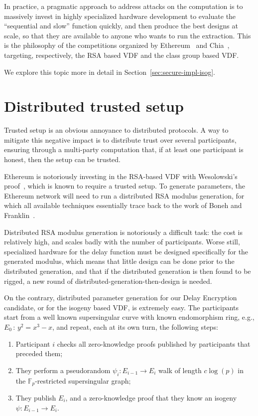 \documentclass{llncs}
\newcommand{\F}{\mathbb{F}}
\begin{document}
In practice, a pragmatic approach to address attacks on the
computation is to massively invest in highly specialized hardware
development to evaluate the ``sequential and slow'' function quickly,
and then produce the best designs at scale, so that they are available
to anyone who wants to run the extraction. %
This is the philosophy of the competitions organized by
Ethereum~\cite{ethereum-vdf} and Chia~\cite{chia-vdf}, targeting,
respectively, the RSA based VDF and the class group based VDF.

We explore this topic more in detail in
Section~\ref{sec:secure-impl-isog}.


\section{Distributed trusted setup}
\label{sec:distr-trust-setup}

Trusted setup is an obvious annoyance to distributed protocols. %
A way to mitigate this negative impact is to distribute trust over
several participants, ensuring through a multi-party computation that,
if at least one participant is honest, then the setup can be trusted.

Ethereum is notoriously investing in the RSA-based VDF with
Wesolowski's proof~\cite{ethereum-vdf,Wesolowski}, which is known to
require a trusted setup. %
To generate parameters, the Ethereum network will need to run a
distributed RSA modulus generation, for which all available techniques
essentially trace back to the work of Boneh and
Franklin~\cite{10.1007/BFb0052253}.

Distributed RSA modulus generation is notoriously a difficult task:
the cost is relatively high, and scales badly with the number of
participants. %
Worse still, specialized hardware for the delay function must be
designed specifically for the generated modulus, which means that
little design can be done prior to the distributed generation, and
that if the distributed generation is then found to be rigged, a new
round of distributed-generation-then-design is needed.

On the contrary, distributed parameter generation for our Delay
Encryption candidate, or for the isogeny based VDF, is extremely
easy. %
The participants start from a well known supersingular curve with
known endomorphism ring, e.g., $E_0\,:\,y^2=x^3-x$, and repeat, each
at its own turn, the following steps:
\begin{enumerate}
\item Participant $i$ checks all zero-knowledge proofs published by
  participants that preceded them;
\item They perform a pseudorandom $\psi_i:E_{i-1}\to E_i$
  walk of length $c\log(p)$ in the $\F_p$-restricted supersingular
  graph;
\item They publish $E_i$, and a zero-knowledge proof that they know an
  isogeny $\psi:E_{i-1}\to E_i$.
\end{enumerate}
\end{document}
